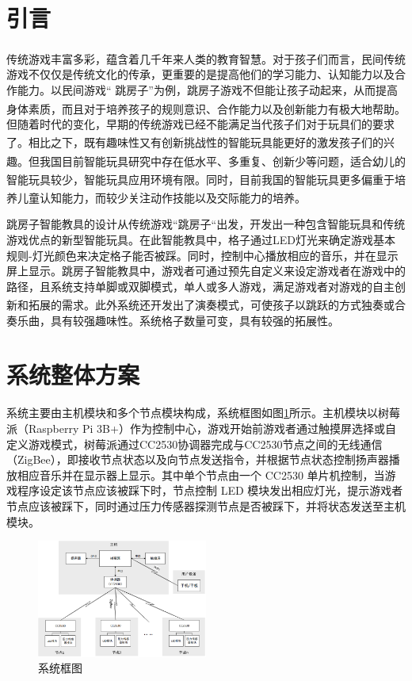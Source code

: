 \documentclass[a4paper,11pt,onecolumn,twoside]{article}
\newcommand{\supercite}[1]{\textsuperscript{\cite{#1}}}
\begin{document}
\begin{spacing}{1.2}
\songti

\section{引言}
    传统游戏丰富多彩，蕴含着几千年来人类的教育智慧\supercite{1}。对于孩子们而言，民间传统游戏不仅仅是传统文化的传承，更重要的是提高他们的学习能力、认知能力以及合作能力。以民间游戏“ 跳房子”为例，跳房子游戏不但能让孩子动起来，从而提高身体素质，而且对于培养孩子的规则意识、合作能力以及创新能力有极大地帮助\supercite{2,3}。但随着时代的变化，早期的传统游戏已经不能满足当代孩子们对于玩具们的要求了\supercite{6}。相比之下，既有趣味性又有创新挑战性的智能玩具能更好的激发孩子们的兴趣。但我国目前智能玩具研究中存在低水平、多重复、创新少等问题\supercite{4}，适合幼儿的智能玩具较少，智能玩具\supercite{7}应用环境有限。同时，目前我国的智能玩具更多偏重于培养儿童认知能力，而较少关注动作技能以及交际能力的培养\supercite{8}。

    跳房子智能教具的设计从传统游戏“跳房子“出发，开发出一种包含智能玩具和传统游戏优点的新型智能玩具。在此智能教具中，格子通过LED灯光来确定游戏基本规则-灯光颜色来决定格子能否被踩。同时，控制中心播放相应的音乐，并在显示屏上显示。跳房子智能教具中，游戏者可通过预先自定义来设定游戏者在游戏中的路径，且系统支持单脚或双脚模式，单人或多人游戏，满足游戏者对游戏的自主创新和拓展的需求\supercite{4,10}。此外系统还开发出了演奏模式，可使孩子以跳跃的方式独奏或合奏乐曲，具有较强趣味性。系统格子数量可变，具有较强的拓展性。

\section{系统整体方案}
    系统主要由主机模块和多个节点模块构成，系统框图如图\ref{fig:kuangtu}所示。主机模块以树莓派（Raspberry Pi 3B+）作为控制中心，游戏开始前游戏者通过触摸屏选择或自定义游戏模式，树莓派通过CC2530协调器完成与CC2530节点之间的无线通信（ZigBee），即接收节点状态以及向节点发送指令，并根据节点状态控制扬声器播放相应音乐并在显示器上显示。其中单个节点由一个 CC2530 单片机控制，当游戏程序设定该节点应该被踩下时，节点控制 LED 模块发出相应灯光，提示游戏者节点应该被踩下，同时通过压力传感器探测节点是否被踩下，并将状态发送至主机模块。

\begin{figure}[htb]
    \centering
    {\includegraphics [width=0.5\textwidth]{./image/框图V3.png}
    \caption{系统框图}
    \label{fig:kuangtu}}
\end{figure}


\end{spacing}
\end{document}
